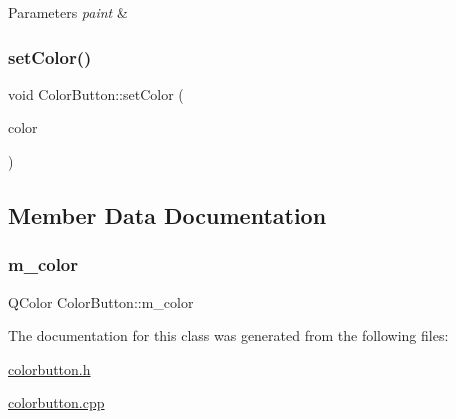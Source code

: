\begin{DoxyParams}{Parameters}
{\em paint} & \\
\hline
\end{DoxyParams}
\mbox{\label{class_color_button_ad0d3747c9ceb3ed57d3f513f42fd4cf2}} 
\subsubsection{\texorpdfstring{set\+Color()}{setColor()}}
{\footnotesize\ttfamily void Color\+Button\+::set\+Color (\begin{DoxyParamCaption}\item[{const Q\+Color \&}]{color }\end{DoxyParamCaption})}



\subsection{Member Data Documentation}
\mbox{\label{class_color_button_aa4408cd251575659e5e8417802f276e4}} 
\subsubsection{\texorpdfstring{m\+\_\+color}{m\_color}}
{\footnotesize\ttfamily Q\+Color Color\+Button\+::m\+\_\+color\hspace{0.3cm}{\ttfamily [protected]}}



The documentation for this class was generated from the following files\+:\begin{DoxyCompactItemize}
\item 
\hyperlink{colorbutton_8h}{colorbutton.\+h}\item 
\hyperlink{colorbutton_8cpp}{colorbutton.\+cpp}\end{DoxyCompactItemize}
